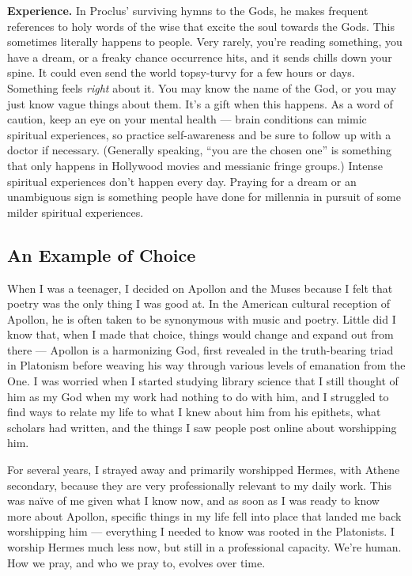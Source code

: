 \documentclass[
]{book}
\begin{document}
\textbf{Experience.} In Proclus' surviving hymns to the Gods, he makes frequent references to holy words of the wise that excite the soul towards the Gods. This sometimes literally happens to people. Very rarely, you're reading something, you have a dream, or a freaky chance occurrence hits, and it sends chills down your spine. It could even send the world topsy-turvy for a few hours or days. Something feels \emph{right} about it. You may know the name of the God, or you may just know vague things about them. It's a gift when this happens. As a word of caution, keep an eye on your mental health --- brain conditions can mimic spiritual experiences, so practice self-awareness and be sure to follow up with a doctor if necessary. (Generally speaking, ``you are the chosen one'' is something that only happens in Hollywood movies and messianic fringe groups.) Intense spiritual experiences don't happen every day. Praying for a dream or an unambiguous sign is something people have done for millennia in pursuit of some milder spiritual experiences.

\hypertarget{an-example-of-choice}{%
\subsection{An Example of Choice}\label{an-example-of-choice}}

When I was a teenager, I decided on Apollon and the Muses because I felt that poetry was the only thing I was good at. In the American cultural reception of Apollon, he is often taken to be synonymous with music and poetry. Little did I know that, when I made that choice, things would change and expand out from there --- Apollon is a harmonizing God, first revealed in the truth-bearing triad in Platonism before weaving his way through various levels of emanation from the One. I was worried when I started studying library science that I still thought of him as my God when my work had nothing to do with him, and I struggled to find ways to relate my life to what I knew about him from his epithets, what scholars had written, and the things I saw people post online about worshipping him.

For several years, I strayed away and primarily worshipped Hermes, with Athene secondary, because they are very professionally relevant to my daily work. This was naïve of me given what I know now, and as soon as I was ready to know more about Apollon, specific things in my life fell into place that landed me back worshipping him --- everything I needed to know was rooted in the Platonists. I worship Hermes much less now, but still in a professional capacity. We're human. How we pray, and who we pray to, evolves over time.
\end{document}
